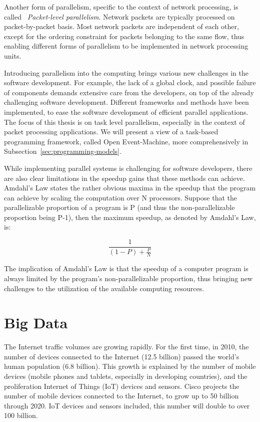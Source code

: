 Another form of parallelism, specific to the context of network processing, is called ~\emph{Packet-level parallelism}. Network packets are typically processed on packet-by-packet basis. Most network packets are independent of each other, except for the ordering constraint for packets belonging to the same flow, thus enabling different forms of parallelism to be implemented in network processing units.~\cite{Liljeqvist:2003:Visions}

Introducing parallelism into the computing brings various new challenges in the software development. For example, the lack of a global clock, and possible failure of components demands extensive care from the developers, on top of the already challenging software development. Different frameworks and methods have been implemented, to ease the software development of efficient parallel applications. The focus of this thesis is on task level parallelism, especially in the context of packet processing applications. We will present a view of a task-based programming framework, called Open Event-Machine, more comprehensively in Subsection~\ref{sec:programming-models}.~\cite{Asanovic:2006:Landscape}

While implementing parallel systems is challenging for software developers, there are also clear limitations in the speedup gains that these methods can achieve. Amdahl's Law states the rather obvious maxima in the speedup that the program can achieve by scaling the computation over N processors. Suppose that the parallelizable proportion of a program is P (and thus the non-parallelizable proportion being P-1), then the maximum speedup, as denoted by Amdahl's Law, is:~\cite{Amdahl:1967:VSP}

\begin{equation*}
  \frac{1}{(1-P) + \frac{P}{N}}
\end{equation*}

The implication of Amdahl's Law is that the speedup of a computer program is always limited by the program's non-parallelizable proportion, thus bringing new challenges to the utilization of the available computing resources.

\section{Big Data}
\label{section:big-data}
The Internet traffic volumes are growing rapidly. For the first time, in 2010, the number of devices connected to the Internet (12.5 billion) passed the world's human population (6.8 billion). This growth is explained by the number of mobile devices (mobile phones and tablets, especially in developing countries), and the proliferation Internet of Things (IoT) devices and sensors. Cisco projects the number of mobile devices connected to the Internet, to grow up to 50 billion through 2020. IoT devices and sensors included, this number will double to over 100 billion.~\cite{Evans:2011:IoT}

